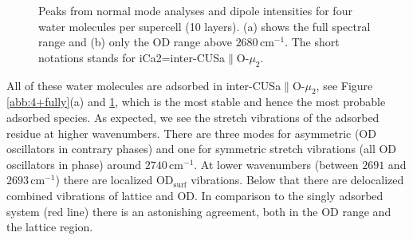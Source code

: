 \documentclass[11pt,DIV=13,BCOR=5mm,a4paper,headinclude]{scrbook}
\begin{document}
\begin{figure}[!h]
    \centering
             \quad
             \quad
             \caption{Peaks from normal mode analyses and dipole intensities for four water molecules per supercell (10 layers).
(a) shows the full spectral range and (b) only the OD range above $2680\,$cm$^{-1}$.
The short notations stands for iCa2=inter-CUSa$\parallel$O-$\mu_2$.}
            \label{abb:4water}
\end{figure}
All of these water molecules are adsorbed in inter-CUSa$\parallel$O-$\mu_2$, see Figure \ref{abb:4+fully}(a) and \ref{abb:4water}, which is the most stable and hence the most probable adsorbed species.
As expected, we see the stretch vibrations of the adsorbed residue at higher wavenumbers.
There are three modes for asymmetric (OD oscillators in contrary phases) and one for symmetric stretch vibrations (all OD oscillators in phase) around $2740\,$cm$^{-1}$.
At lower wavenumbers (between $2691$ and $2693\,$cm$^{-1}$) there are localized OD$_\textrm{surf}$ vibrations.
Below that there are delocalized combined vibrations of lattice and OD.
In comparison to the singly adsorbed system (red line) there is an astonishing agreement, both in the OD range and the lattice region.
\end{document}
